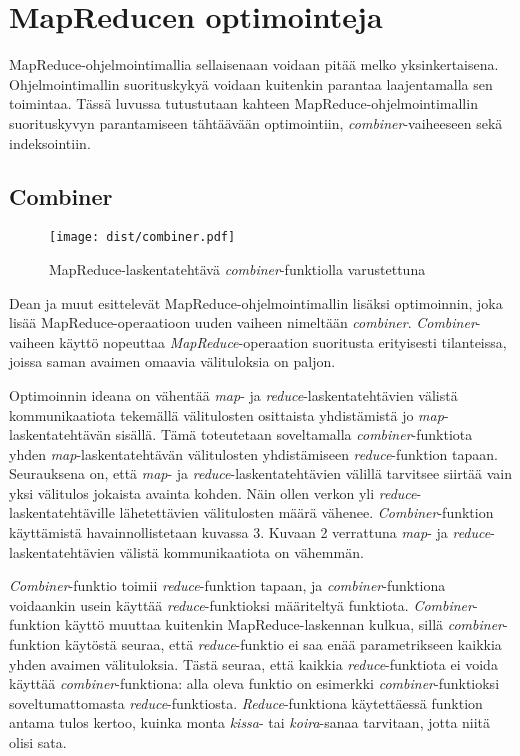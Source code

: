 \documentclass[finnish]{templates/tktltiki2}
\theoremstyle{definition}
\theoremstyle{remark}
\begin{document}
\section{MapReducen optimointeja}\label{mapreducen-optimointeja}

MapReduce-ohjelmointimallia sellaisenaan voidaan pitää melko
yksinkertaisena. Ohjelmointimallin suorituskykyä voidaan kuitenkin
parantaa laajentamalla sen toimintaa. Tässä luvussa tutustutaan kahteen
MapReduce-ohjelmointimallin suorituskyvyn parantamiseen tähtäävään
optimointiin, \emph{combiner}-vaiheeseen sekä indeksointiin.

\subsection{Combiner}\label{combiner}

\begin{figure}[!b]
\centering
\texttt{[image: dist/combiner.pdf]}
\caption{MapReduce-laskentatehtävä \emph{combiner}-funktiolla
varustettuna}
\end{figure}

Dean ja muut \cite{mapreduce} esittelevät
MapReduce-ohjelmointimallin lisäksi optimoinnin, joka lisää
MapReduce-operaatioon uuden vaiheen nimeltään \emph{combiner}.
\emph{Combiner}-vaiheen käyttö nopeuttaa \emph{MapReduce}-operaation
suoritusta erityisesti tilanteissa, joissa saman avaimen omaavia
välituloksia on paljon.

Optimoinnin ideana on vähentää \emph{map}- ja
\emph{reduce}-laskentatehtävien välistä kommunikaatiota tekemällä
välitulosten osittaista yhdistämistä jo \emph{map}-laskentatehtävän
sisällä. Tämä toteutetaan soveltamalla \emph{combiner}-funktiota yhden
\emph{map}-laskentatehtävän välitulosten yhdistämiseen
\emph{reduce}-funktion tapaan. Seurauksena on, että \emph{map}- ja
\emph{reduce}-laskentatehtävien välillä tarvitsee siirtää vain yksi
välitulos jokaista avainta kohden. Näin ollen verkon yli
\emph{reduce}-laskentatehtäville lähetettävien välitulosten määrä
vähenee. \emph{Combiner}-funktion käyttämistä havainnollistetaan kuvassa
3. Kuvaan 2 verrattuna \emph{map}- ja \emph{reduce}-laskentatehtävien
välistä kommunikaatiota on vähemmän.

\emph{Combiner}-funktio toimii \emph{reduce}-funktion tapaan, ja
\emph{combiner}-funktiona voidaankin usein käyttää
\emph{reduce}-funktioksi määriteltyä funktiota. \emph{Combiner}-funktion
käyttö muuttaa kuitenkin MapReduce-laskennan kulkua, sillä
\emph{combiner}-funktion käytöstä seuraa, että \emph{reduce}-funktio ei
saa enää parametrikseen kaikkia yhden avaimen välituloksia. Tästä
seuraa, että kaikkia \emph{reduce}-funktiota ei voida käyttää
\emph{combiner}-funktiona: alla oleva funktio on esimerkki
\emph{combiner}-funktioksi soveltumattomasta \emph{reduce}-funktiosta.
\emph{Reduce}-funktiona käytettäessä funktion antama tulos kertoo,
kuinka monta \emph{kissa}- tai \emph{koira}-sanaa tarvitaan, jotta niitä
olisi sata.
\end{document}
